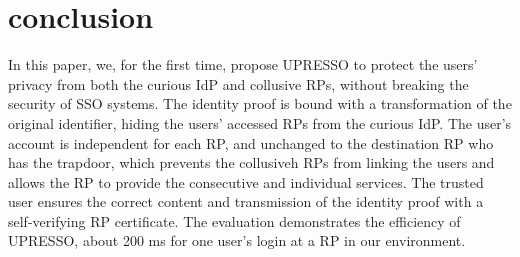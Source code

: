 \section{conclusion}
\label{sec:conclusion}
In this paper, we, for the first time, propose UPRESSO to protect the users' privacy from both the curious IdP and collusive RPs,  without breaking the security of SSO systems.
The identity proof is bound with a transformation of the original identifier, hiding the users' accessed RPs from the curious IdP. The user's account is independent for each RP, and unchanged to the destination RP who has the trapdoor, which prevents the collusiveh RPs from linking the users and allows the RP to provide the consecutive and individual services. The trusted user ensures the correct content and transmission of the identity proof with a self-verifying RP certificate. The evaluation demonstrates the efficiency of UPRESSO, about 200 ms for one user's login at a RP in our environment.
